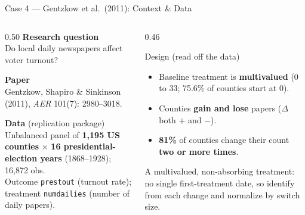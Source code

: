 \documentclass[main.tex]{subfiles}
\begin{document}

\begin{frame}{Case 4 --- Gentzkow et al.\ (2011): Context \& Data}

  \begin{columns}[T]
    \begin{column}{0.50\textwidth}
      \textbf{Research question}\\
      Do local daily newspapers affect voter turnout?

      \medskip
      \textbf{Paper}\\
      Gentzkow, Shapiro \& Sinkinson (2011),
      \textit{AER} 101(7): 2980--3018.

      \medskip
      \textbf{Data} (replication package)\\
      Unbalanced panel of \textbf{1{,}195 US counties}
      $\times$ \textbf{16 presidential-election years} (1868--1928);
      16{,}872 obs.\\[3pt]
      Outcome \texttt{prestout} (turnout rate); treatment
      \texttt{numdailies} (number of daily papers).
    \end{column}
    \begin{column}{0.46\textwidth}
      \begin{block}{Design (read off the data)}
        \footnotesize
        \begin{itemize}\footnotesize
          \item Baseline treatment is \textbf{multivalued}
            (0 to 33; 75.6\% of counties start at 0).
          \item Counties \textbf{gain and lose} papers
            ($\Delta$ both $+$ and $-$).
          \item \textbf{81\%} of counties change their count
            \textbf{two or more times}.
        \end{itemize}
      \end{block}

      \smallskip
      \footnotesize A multivalued, non-absorbing treatment: no single
      first-treatment date, so identify from each change and normalize
      by switch size.
    \end{column}
  \end{columns}

\end{frame}
\end{document}
